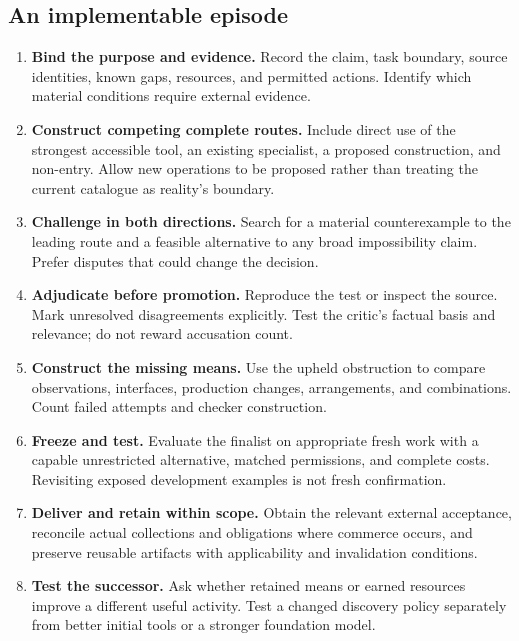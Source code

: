 \documentclass[11pt,a4paper]{article}
\begin{document}
\subsection{An implementable episode}
\begin{enumerate}
\item \textbf{Bind the purpose and evidence.} Record the claim, task boundary, source identities, known gaps, resources, and permitted actions. Identify which material conditions require external evidence.
\item \textbf{Construct competing complete routes.} Include direct use of the strongest accessible tool, an existing specialist, a proposed construction, and non-entry. Allow new operations to be proposed rather than treating the current catalogue as reality's boundary.
\item \textbf{Challenge in both directions.} Search for a material counterexample to the leading route and a feasible alternative to any broad impossibility claim. Prefer disputes that could change the decision.
\item \textbf{Adjudicate before promotion.} Reproduce the test or inspect the source. Mark unresolved disagreements explicitly. Test the critic's factual basis and relevance; do not reward accusation count.
\item \textbf{Construct the missing means.} Use the upheld obstruction to compare observations, interfaces, production changes, arrangements, and combinations. Count failed attempts and checker construction.
\item \textbf{Freeze and test.} Evaluate the finalist on appropriate fresh work with a capable unrestricted alternative, matched permissions, and complete costs. Revisiting exposed development examples is not fresh confirmation.
\item \textbf{Deliver and retain within scope.} Obtain the relevant external acceptance, reconcile actual collections and obligations where commerce occurs, and preserve reusable artifacts with applicability and invalidation conditions.
\item \textbf{Test the successor.} Ask whether retained means or earned resources improve a different useful activity. Test a changed discovery policy separately from better initial tools or a stronger foundation model.
\end{enumerate}
\end{document}
